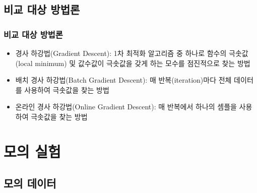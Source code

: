 \documentclass{beamer}
\begin{document}






\subsection{비교 대상 방법론} %

\begin{frame}
\frametitle{비교 대상 방법론}
\begin{itemize}
\item 경사 하강법(Gradient Descent): 1차 최적화 알고리즘 중 하나로 함수의 극솟값(local minimum) 및 값수값이 극솟값을 갖게 하는 모수를 점진적으로 찾는 방법
\item 배치 경사 하강법(Batch Gradient Descent): 매 반복(iteration)마다 전체 데이터를 사용하여 극솟값을 찾는 방법
\item 온라인 경사 하강법(Online Gradient Descent): 매 반복에서 하나의 셈플을 사용하여 극솟값을 찾는 방법
\end{itemize}
\end{frame}








\section{모의 실험} %

\subsection{모의 데이터} %
\end{document}
